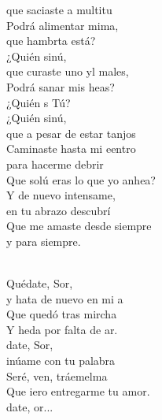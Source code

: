 \begin{cancion}
	que saciaste a multitu\\
	Podrá alimentar mima, \\
	que hambrta está?\\
	¿Quién sinú, \\
	que curaste uno yl males,\\
	Podrá sanar mis heas?\\
	¿Quién s Tú?\\
	¿Quién sinú,\\
	que a pesar de estar tanjos\\
	Caminaste hasta mi eentro\\
	para hacerme debrir\\
	Que solú eras lo que yo anhea?\\
	Y de nuevo intensame,\\
en tu abrazo descubrí\\
Que me amaste desde siempre\\
y para siempre.\\\jump\\
	\begin{chorus}%
	Quédate, Sor,\\
	y hata de nuevo en mi a\\
	Que  quedó tras mircha\\
	Y heda por falta de ar.\\
	date, Sor, \\
	inúame con tu palabra\\
	Seré, ven, tráemelma \\
	Que iero entregarme tu amor.\\
	date, or...          \\
	\end{chorus}%
	\jump\\
\end{cancion}%
